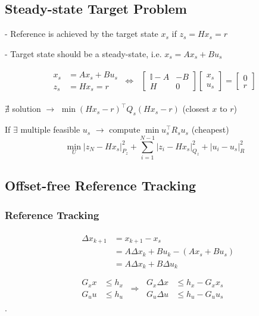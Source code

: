 
\subsection{Steady-state Target Problem}

- Reference is achieved by the target
state $x_s$ if $z_s = Hx_s = r$

- Target state should be a steady-state,
i.e. $x_s = Ax_s + Bu_s$

\begin{align*}
	\begin{aligned}
		x_s & = Ax_s + Bu_s \\
		z_s & = Hx_s = r
	\end{aligned}
	\ \Longleftrightarrow \
	\begin{aligned}
		\begin{bmatrix}
			\mathbb{I} - A & -B \\
			H              & 0
		\end{bmatrix}
		\begin{bmatrix}
			x_s \\
			u_s
		\end{bmatrix}
		=
		\begin{bmatrix}
			0 \\
			r
		\end{bmatrix}
	\end{aligned}
\end{align*}

$\nexists$ solution
$\rightarrow$
$\min (Hx_s - r)^\top Q_s (H x_s - r)$
(closest $x$ to $r$)

If $\exists$ multiple feasible $u_s$
$\rightarrow$
compute
$\min u_s^\top R_s u_s$
(cheapest)
\[
	\min_U |z_N - Hx_s|_{P_z}^2
	\!+\! \sum_{i=1}^{N-1} | z_i - Hx_s |_{Q_z}^2
	+ | u_i - u_s |_{R}^2
\]

\subsection{Offset-free Reference Tracking}

\subsubsection{Reference Tracking}

\begin{align*}
	 &
	\begin{aligned}
		\Delta x_{k+1}
		 & = x_{k+1} -x_s                          \\
		 & = A\Delta x_k + B u_k - (A x_s + B u_s) \\
		 & = A\Delta x_k + B\Delta u_k             \\
	\end{aligned}
	\\&
	\begin{aligned}
		G_x  x & \leq h_x \\
		G_u  u & \leq h_u
	\end{aligned}
	\ \Rightarrow \
	\begin{aligned}
		G_x \Delta x & \leq h_x - G_x x_s \\
		G_u \Delta u & \leq h_u - G_u u_s
	\end{aligned}
\end{align*}
.
